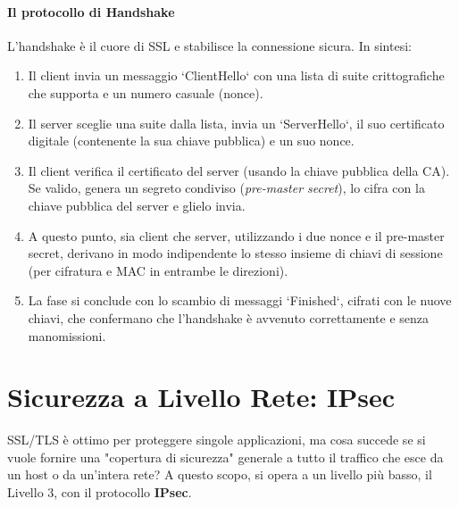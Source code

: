 \paragraph{Il protocollo di Handshake}
L'handshake è il cuore di SSL e stabilisce la connessione sicura. In sintesi:
\begin{enumerate}
    \item Il client invia un messaggio `ClientHello` con una lista di suite crittografiche che supporta e un numero casuale (nonce).
    \item Il server sceglie una suite dalla lista, invia un `ServerHello`, il suo certificato digitale (contenente la sua chiave pubblica) e un suo nonce.
    \item Il client verifica il certificato del server (usando la chiave pubblica della CA). Se valido, genera un segreto condiviso (\textit{pre-master secret}), lo cifra con la chiave pubblica del server e glielo invia.
    \item A questo punto, sia client che server, utilizzando i due nonce e il pre-master secret, derivano in modo indipendente lo stesso insieme di chiavi di sessione (per cifratura e MAC in entrambe le direzioni).
    \item La fase si conclude con lo scambio di messaggi `Finished`, cifrati con le nuove chiavi, che confermano che l'handshake è avvenuto correttamente e senza manomissioni.
\end{enumerate}

\section{Sicurezza a Livello Rete: IPsec}
SSL/TLS è ottimo per proteggere singole applicazioni, ma cosa succede se si vuole fornire una "copertura di sicurezza" generale a tutto il traffico che esce da un host o da un'intera rete? A questo scopo, si opera a un livello più basso, il Livello 3, con il protocollo \textbf{IPsec}.



